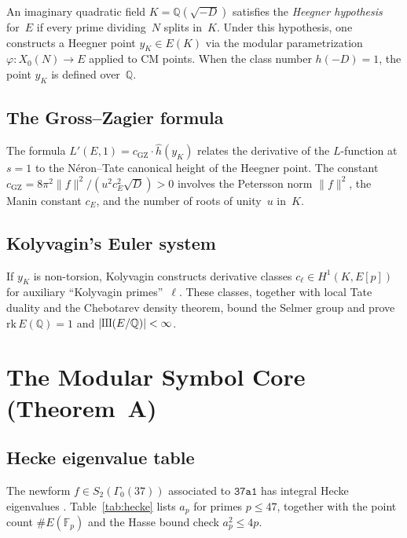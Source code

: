 \documentclass[11pt]{article}
\theoremstyle{plain}
\theoremstyle{definition}
\theoremstyle{remark}
\newcommand{\Q}{\mathbb{Q}}
\newcommand{\F}{\mathbb{F}}
\newcommand{\Sha}{\text{\raisebox{0.05ex}{\scalebox{0.85}[1]{III}}}}
\newcommand{\rk}{\mathrm{rk}}
\newcommand{\hhat}{\hat{h}}
\begin{document}
An imaginary quadratic field $K = \Q(\sqrt{-D})$ satisfies the \emph{Heegner hypothesis} for~$E$ if every prime dividing~$N$ splits in~$K$. Under this hypothesis, one constructs a Heegner point $y_K \in E(K)$ via the modular parametrization $\varphi: X_0(N) \to E$ applied to CM points. When the class number $h(-D) = 1$, the point $y_K$ is defined over~$\Q$.

\subsection{The Gross--Zagier formula}

The formula $L'(E,1) = c_{\mathrm{GZ}} \cdot \hhat(y_K)$ \cite{gross-zagier} relates the derivative of the $L$-function at $s = 1$ to the N\'eron--Tate canonical height of the Heegner point. The constant $c_{\mathrm{GZ}} = 8\pi^2\|f\|^2 / (u^2 c_E^2 \sqrt{D}) > 0$ involves the Petersson norm $\|f\|^2$, the Manin constant $c_E$, and the number of roots of unity~$u$ in~$K$.

\subsection{Kolyvagin's Euler system}

If $y_K$ is non-torsion, Kolyvagin \cite{kolyvagin1988,kolyvagin1990} constructs derivative classes $c_\ell \in H^1(K, E[p])$ for auxiliary ``Kolyvagin primes''~$\ell$. These classes, together with local Tate duality and the Chebotarev density theorem, bound the Selmer group and prove $\rk\, E(\Q) = 1$ and $|\Sha(E/\Q)| < \infty$.


\section{The Modular Symbol Core (Theorem~A)}
\label{sec:hecke}

\subsection{Hecke eigenvalue table}

The newform $f \in S_2(\Gamma_0(37))$ associated to $\texttt{37a1}$ has integral Hecke eigenvalues \cite{cremona}. Table~\ref{tab:hecke} lists $a_p$ for primes $p \leq 47$, together with the point count $\#E(\F_p)$ and the Hasse bound check $a_p^2 \leq 4p$.
\end{document}
